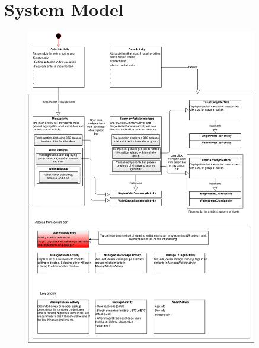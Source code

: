 \clearpage
\section{System Model}

\begin{figure}[H]
    \includegraphics[width=0.9\textwidth]{../diagrams/activities.png}
\end{figure}
